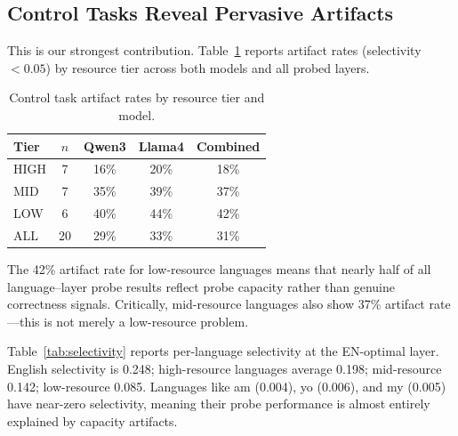 \documentclass[11pt,a4paper]{article}
\begin{document}
\subsection{Control Tasks Reveal Pervasive Artifacts}
\label{sec:control}

This is our strongest contribution.
Table~\ref{tab:control_rates} reports artifact rates (selectivity $< 0.05$) by resource tier across both models and all probed layers.

\begin{table}[t]
\centering
\small
\caption{Control task artifact rates by resource tier and model.}
\label{tab:control_rates}
\begin{tabular}{lcccc}
\toprule
Tier & $n$ & Qwen3 & Llama4 & Combined \\
\midrule
HIGH & 7 & 16\% & 20\% & 18\% \\
MID  & 7 & 35\% & 39\% & 37\% \\
LOW  & 6 & 40\% & 44\% & 42\% \\
\midrule
ALL  & 20 & 29\% & 33\% & 31\% \\
\bottomrule
\end{tabular}
\end{table}

The 42\% artifact rate for low-resource languages means that nearly half of all language--layer probe results reflect probe capacity rather than genuine correctness signals.
Critically, mid-resource languages also show 37\% artifact rate---this is not merely a low-resource problem.

Table~\ref{tab:selectivity} reports per-language selectivity at the EN-optimal layer.
English selectivity is 0.248; high-resource languages average 0.198; mid-resource 0.142; low-resource 0.085.
Languages like am (0.004), yo (0.006), and my (0.005) have near-zero selectivity, meaning their probe performance is almost entirely explained by capacity artifacts.
\end{document}
